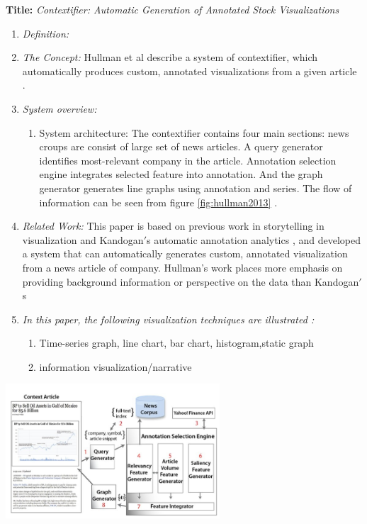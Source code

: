\documentclass{egpubl}
\begin{document}
\textbf{Title:} \textit{Contextifier: Automatic Generation of Annotated Stock Visualizations}
\begin{enumerate}
\item \textit{Definition:} 
\item \textit{The Concept:} Hullman et al describe a system of contextifier, which automatically produces custom, annotated visualizations from a given article \cite{hullman2013}. 
\item \textit{System overview:}
\begin{enumerate}
\item System architecture: The contextifier contains four main sections: news croups are consist of large set of news articles. A query generator identifies most-relevant company in the article. Annotation selection engine integrates selected feature into annotation. And the graph generator generates line graphs using annotation and series. The flow of information can be seen from figure \ref{fig:hullman2013} \cite{hullman2013}.
\end{enumerate}
\item \textit{Related Work:} This paper is based on previous work in storytelling in visualization \cite{segal} and Kandogan$'$s automatic annotation analytics \cite{kandogan2012}, and developed a system that can automatically generates custom, annotated visualization from a news article of company. Hullman's work places more emphasis on providing background information or perspective on the data than Kandogan$'$s \cite{kandogan2012}
\item \textit{In this paper, the following visualization techniques are illustrated :} 
\begin{enumerate}
\item Time-series graph, line chart, bar chart, histogram,static graph
\item information visualization/narrative
\end{enumerate}
\end{enumerate}

\begingroup
\centering
\includegraphics[width=8cm]{./images/hullman2013}
\label{fig:hullman2013}
\endgroup
\end{document}
